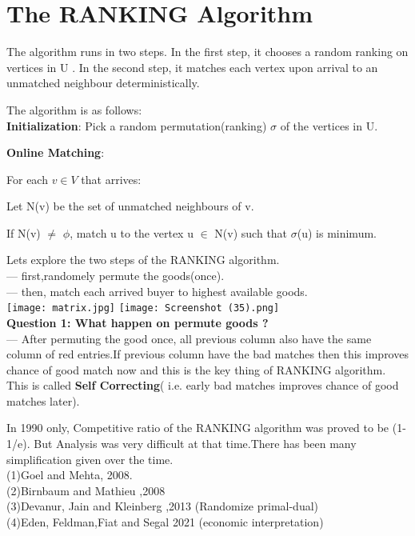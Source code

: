 \documentclass[conference,compsoc]{IEEEtran}
\begin{document}
\section{The RANKING Algorithm} 
\noindent The algorithm runs in two steps. In the first step, it chooses a random ranking on vertices in U . In the second step, it matches each vertex upon arrival to an unmatched neighbour deterministically.\\
\par
\noindent The algorithm is as follows:\\
\noindent \textbf {Initialization}: Pick a random permutation(ranking) 
$ \sigma $ of the vertices in U.\par
\noindent \textbf{Online Matching}:\par
\noindent For each $ v \in V $ that arrives:\par
\noindent Let N(v) be the set of unmatched neighbours of v.\par
\noindent If N(v) $ \neq $ $ \phi $, match u to the vertex u $ \in $ N(v) such that $ \sigma $(u) is minimum.
\\
\par
Lets explore the two steps of the RANKING algorithm.\\
 --- first,randomely permute the goods(once).\\
 --- then, match each arrived buyer to highest available goods.
\\
\texttt{[image: matrix.jpg]}
\texttt{[image: Screenshot (35).png]}
\\

\textbf{Question 1: What happen on permute goods ?} \\
--- After permuting the good once, all previous column also have the same column of red entries.If previous column have the bad matches then this improves chance of good match now and this is the key thing of RANKING algorithm. This is called \textbf{Self Correcting}( i.e. early bad matches improves chance of good matches later).
\\
\par
In 1990 only, Competitive ratio of the RANKING algorithm was proved to be (1-1/e). But Analysis was very difficult at that time.There has been many simplification given over the time.\\
(1)Goel and Mehta, 2008.\\
(2)Birnbaum and Mathieu ,2008\\
(3)Devanur, Jain and Kleinberg ,2013 (Randomize primal-dual)\\
(4)Eden, Feldman,Fiat and Segal 2021 (economic interpretation)\\
\end{document}
